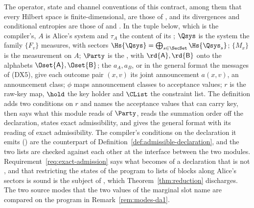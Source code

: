 The operator, state and channel conventions of this contract, among them
that every Hilbert space is finite-dimensional, are those of
, and its divergences and conditional
entropies are those of  and
. In the tuple below, which is the compiler's,
$A$ is Alice's system and $\tau_A$ the content of its ;
$\Qsys$ is the system the family $\{F_v\}$ measures, with sectors
$\Hs{\Qsys}=\bigoplus_{s\in\SecSet}\Hs{\Qsys_s}$; $\{M_x\}$ is the
measurement on $A$; $\Party$ is the , with
 $\rd{\mathsf A},\rd{\mathsf B}$ onto the
alphabets $\Oset{\mathsf A},\Oset{\mathsf B}$; the
 $a_A,a_B$, or in the general
format the messages of (DX5), give each outcome pair $(x,v)$ its joint
announcement $a(x,v)$, an announcement class; $\phi$ maps
announcement classes to acceptance values; $r$ is the raw-key map, $\hold$
the key holder and $\CList$ the constraint list. The definition adds two
conditions on $r$ and names the acceptance values that can carry key, then
says what this module reads of $\Party$, reads the summation order off the
declaration, states exact admissibility, and gives the general format with its reading of
exact admissibility. The
compiler's conditions on the declaration it emits
() are the counterpart of
Definition~\ref{def:admissible-declaration}, and the two lists are checked against each other
at the interface between the two modules.
Requirement~\ref{req:exact-admission} says what becomes of a declaration that
is not , and that restricting the states of the
program to lists of blocks along Alice's sectors is sound is the subject of
, which Theorem~\ref{thm:reduction}
discharges. The two source modes that the two values of the marginal slot
name are compared on the program in Remark~\ref{rem:modes-da1}.

